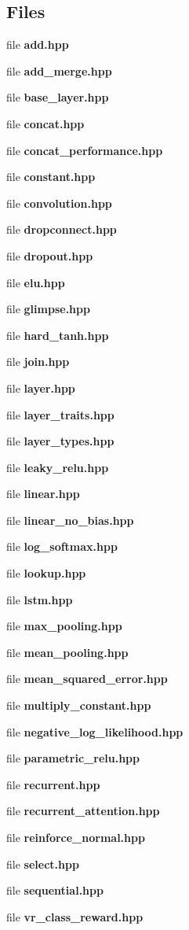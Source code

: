 \subsection*{Files}
\begin{DoxyCompactItemize}
\item 
file {\bf add.\+hpp}
\item 
file {\bf add\+\_\+merge.\+hpp}
\item 
file {\bf base\+\_\+layer.\+hpp}
\item 
file {\bf concat.\+hpp}
\item 
file {\bf concat\+\_\+performance.\+hpp}
\item 
file {\bf constant.\+hpp}
\item 
file {\bf convolution.\+hpp}
\item 
file {\bf dropconnect.\+hpp}
\item 
file {\bf dropout.\+hpp}
\item 
file {\bf elu.\+hpp}
\item 
file {\bf glimpse.\+hpp}
\item 
file {\bf hard\+\_\+tanh.\+hpp}
\item 
file {\bf join.\+hpp}
\item 
file {\bf layer.\+hpp}
\item 
file {\bf layer\+\_\+traits.\+hpp}
\item 
file {\bf layer\+\_\+types.\+hpp}
\item 
file {\bf leaky\+\_\+relu.\+hpp}
\item 
file {\bf linear.\+hpp}
\item 
file {\bf linear\+\_\+no\+\_\+bias.\+hpp}
\item 
file {\bf log\+\_\+softmax.\+hpp}
\item 
file {\bf lookup.\+hpp}
\item 
file {\bf lstm.\+hpp}
\item 
file {\bf max\+\_\+pooling.\+hpp}
\item 
file {\bf mean\+\_\+pooling.\+hpp}
\item 
file {\bf mean\+\_\+squared\+\_\+error.\+hpp}
\item 
file {\bf multiply\+\_\+constant.\+hpp}
\item 
file {\bf negative\+\_\+log\+\_\+likelihood.\+hpp}
\item 
file {\bf parametric\+\_\+relu.\+hpp}
\item 
file {\bf recurrent.\+hpp}
\item 
file {\bf recurrent\+\_\+attention.\+hpp}
\item 
file {\bf reinforce\+\_\+normal.\+hpp}
\item 
file {\bf select.\+hpp}
\item 
file {\bf sequential.\+hpp}
\item 
file {\bf vr\+\_\+class\+\_\+reward.\+hpp}
\end{DoxyCompactItemize}
